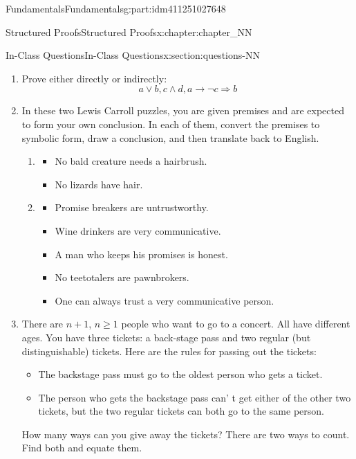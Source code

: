 \documentclass[oneside,10pt,]{book}
\numberwithin{equation}{section}
\begin{document}
\begin{partptx}{Fundamentals}{}{Fundamentals}{}{}{g:part:idm411251027648}
\begin{chapterptx}{Structured Proofs}{}{Structured Proofs}{}{}{x:chapter:chapter_NN}
\begin{sectionptx}{In-Class Questions}{}{In-Class Questions}{}{}{x:section:questions-NN}
\begin{enumerate}[label=\arabic*.]
\item{}Prove either directly or indirectly:%
\begin{equation*}
a \lor  b, c \land  d, a \rightarrow  \neg c \Rightarrow  b
\end{equation*}
%
\item{}In these two Lewis Carroll puzzles, you are given premises and are expected to form your own conclusion.  In each of them, convert the premises to symbolic form, draw a conclusion, and then translate back to English.%
\begin{enumerate}[label=(\alph*)]
\item{}%
\begin{itemize}[label=\textbullet]
\item{}No bald creature needs a hairbrush.%
\item{}No lizards have hair.%
\end{itemize}
%
\item{}%
\begin{itemize}[label=\textbullet]
\item{}Promise breakers are untrustworthy.%
\item{}Wine drinkers are very communicative.%
\item{}A man who keeps his promises is honest.%
\item{}No teetotalers are pawnbrokers.%
\item{}One can always trust a very communicative person.%
\end{itemize}
%
\end{enumerate}
%
\item{}There are \(n+1\), \(n\ge 1\) people who want to go to a concert.  All have different ages. You have three tickets: a back-stage pass and two regular (but distinguishable) tickets. Here are the rules for passing out the tickets:%
\begin{itemize}[label=\textbullet]
\item{}The backstage pass must go to the oldest person who gets a ticket.%
\item{}The person who gets the backstage pass can' t get either of the other two tickets, but the two regular tickets can both go to the same person.%
\end{itemize}
How many ways can you give away the tickets? There are two ways to count. Find both and equate them.%
\end{enumerate}
%
\end{sectionptx}
%
%
\typeout{************************************************}

\end{chapterptx}
\end{partptx}
\end{document}
